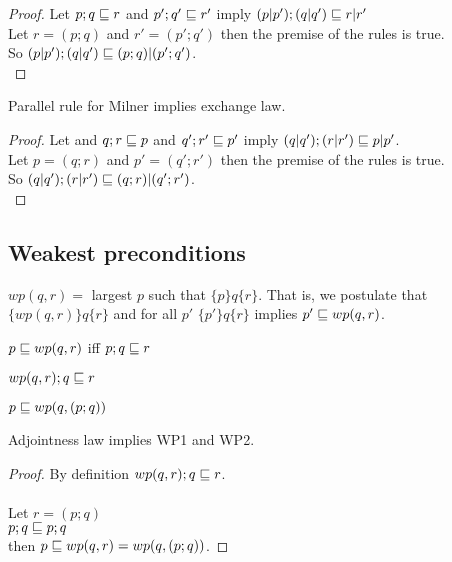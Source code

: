 \documentclass{article}
\begin{document}
\verified

\begin{proof}
Let $p; q \sqsubseteq r$ and $p'; q' \sqsubseteq r'$ imply $(p | p'); (q | q') \sqsubseteq r | r'$\\
Let $r = (p; q)$ and $r' = (p'; q')$ then the premise of the rules is true.\\
So $(p | p'); (q | q') \sqsubseteq (p; q) | (p'; q')$.\\
\end{proof}

\begin{theorem}
Parallel rule for Milner implies exchange law.
\end{theorem}

\verified

\begin{proof}
Let and $q; r \sqsubseteq p$ and $q'; r' \sqsubseteq p'$ imply $(q | q'); (r | r') \sqsubseteq p | p'$.\\
Let $p = (q; r)$ and $p' = (q'; r')$ then the premise of the rules is true.\\
So $(q | q'); (r | r') \sqsubseteq (q; r) | (q'; r')$.\\
\end{proof}

\subsection*{Weakest preconditions}

\begin{definition}
$wp(q, r) =$ largest $p$ such that $\{p\}q\{r\}$.
That is, we postulate that $\{wp(q, r)\} q \{r\}$ and
for all $p'$ $\{p'\}q\{r\}$ implies $p' \sqsubseteq wp(q, r)$.
\end{definition}

\begin{law}[Adjointness]
$p \sqsubseteq wp(q, r)$ iff $p; q \sqsubseteq r$
\end{law}

\begin{rul}[WP1]
$wp(q, r); q \sqsubseteq r$
\end{rul}

\begin{rul}[WP2]
$p \sqsubseteq wp(q, (p; q))$
\end{rul}

\begin{theorem}
Adjointness law implies WP1 and WP2.
\end{theorem}

\begin{proof}
By definition $wp(q, r); q \sqsubseteq r$.\\
\\
Let $r = (p; q)$\\
$p; q \sqsubseteq p; q$\\
then $p \sqsubseteq wp(q, r) = wp(q, (p; q))$.
\end{proof}
\end{document}
